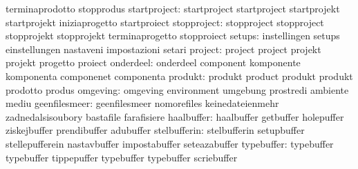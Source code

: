                                   terminaprodotto                  stopprodus
                    startproject: startproject                     startproject
                                  startprojekt                     startprojekt
                                  iniziaprogetto                   startproiect
                     stopproject: stopproject                      stopproject
                                  stopprojekt                      stopprojekt
                                  terminaprogetto                  stopproiect
                          setups: instellingen                     setups
                                  einstellungen                    nastaveni
                                  impostazioni                     setari
                         project: project                          project
                                  projekt                          projekt
                                  progetto                         proiect
                       onderdeel: onderdeel                        component
                                  komponente                       komponenta
                                  componenet                       componenta
                         produkt: produkt                          product
                                  produkt                          produkt
                                  prodotto                         produs
                        omgeving: omgeving                         environment
                                  umgebung                         prostredi
                                  ambiente                         mediu
                   geenfilesmeer: geenfilesmeer                    nomorefiles
                                  keinedateienmehr                 zadnedalsisoubory
                                  bastafile                        farafisiere
                      haalbuffer: haalbuffer                       getbuffer
                                  holepuffer                       ziskejbuffer
                                  prendibuffer                     adubuffer
                    stelbufferin: stelbufferin                     setupbuffer
                                  stellepufferein                  nastavbuffer
                                  impostabuffer                    seteazabuffer
                      typebuffer: typebuffer                       typebuffer
                                  tippepuffer                      typebuffer
                                  typebuffer                       scriebuffer %
